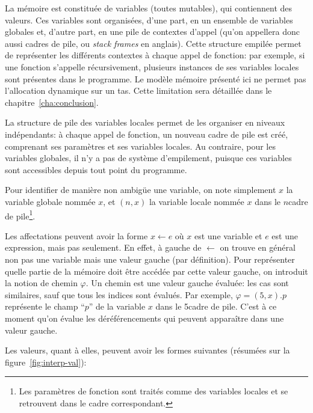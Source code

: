 La mémoire est constituée de variables (toutes mutables), qui contiennent des
valeurs. Ces variables sont organisées, d'une part, en un ensemble de variables
globales et, d'autre part, en une pile de contextes d'appel (qu'on appellera
donc aussi cadres de pile, ou \emph{stack frames} en anglais). Cette structure
empilée permet de représenter les différents contextes à chaque appel de
fonction: par exemple, si une fonction s'appelle récursivement, plusieurs
instances de ses variables locales sont présentes dans le programme. Le modèle
mémoire présenté ici ne permet pas l'allocation dynamique sur un tas. Cette
limitation sera détaillée dans le chapitre~\ref{cha:conclusion}.


La structure de pile des variables locales permet de les organiser en niveaux
indépendants: à chaque appel de fonction, un nouveau cadre de pile est créé,
comprenant ses paramètres et ses variables locales. Au contraire, pour les
variables globales, il n'y a pas de système d'empilement, puisque ces variables
sont accessibles depuis tout point du programme.

Pour identifier de manière non ambigüe une variable, on note simplement $x$ la
variable globale nommée $x$, et $(n, x)$ la variable locale nommée $x$ dans le
$n$\ieme cadre de pile\footnote{Les paramètres de fonction sont traités comme
des variables locales et se retrouvent dans le cadre correspondant.}.

Les affectations peuvent avoir la forme $x ← e$ où $x$ est une variable et $e$
est une expression, mais pas seulement. En effet, à gauche de $←$ on trouve en
général non pas une variable mais une valeur gauche (par définition). Pour
représenter quelle partie de la mémoire doit être accédée par cette valeur
gauche, on introduit la notion de chemin $φ$. Un chemin est une valeur gauche
évaluée: les cas sont similaires, sauf que tous les indices sont évalués. Par
exemple, $φ = (5, x).p$ représente le champ \enquote{$p$} de la variable $x$
dans le 5\ieme cadre de pile. C'est à ce moment qu'on évalue les
déréférencements qui peuvent apparaître dans une valeur gauche.

Les valeurs, quant à elles, peuvent avoir les formes suivantes (résumées sur la
figure~\ref{fig:interp-val}):

